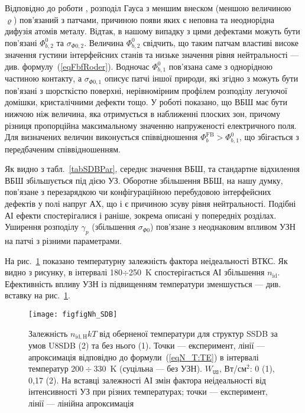 Відповідно до роботи \cite{Jiang:DGJap},
розподіл Гауса з меншим внеском (меншою величиною $\varrho$) пов'язаний з патчами, причиною появи яких є
неповна та неоднорідна дифузія атомів металу.
Відтак, в нашому випадку з цими дефектами можуть бути пов'язані $\Phi_{b,2}^0$ та $\sigma_{\Phi0,2}$.
Величина $\Phi_{b,2}^0$ свідчить, що таким патчам властиві високе значення густини інтерфейсних станів та низьке значення рівня нейтральності --- див. формулу~(\ref{eqFbfRoder}).
Водночас $\Phi_{b,1}^0$ пов'язана саме з однорідною частиною контакту,
а $\sigma_{\Phi0,1}$ описує патчі іншої природи, які згідно з \cite{Gammon2013} можуть бути пов'язані з шорсткістю поверхні,
нерівномірним профілем розподілу легуючої домішки, кристалічними дефекти тощо.
У роботі \cite{Rhoderick1988} показано, що ВБШ має бути нижчою ніж величина, яка отримується в наближенні плоских зон,
причому різниця пропорційна максимальному значенню напруженості електричного поля.
Для визначених величин виконується співвідношення $\Phi_{b}^\mathrm{FB}>\Phi_{b,1}^0$, що  збігається з передбаченим співвідношенням.

Як видно з табл.~\ref{tabSDBPar}, середнє значення ВБШ, та стандартне відхилення ВБШ збільшується під дією УЗ.
Оборотне збільшення ВБШ, на нашу думку, пов'язане з перезарядкою чи конфігураційною перебудовою інтерфейсних дефектів у полі напруг
АХ, що і є причиною зсуву рівня нейтральності.
Подібні АІ ефекти спостерігалися і раніше, зокрема описані у попередніх розділах.
Уширення розподілу $\gamma_p$ (збільшення $\sigma_{\Phi0}$) пов'язане з неоднаковим впливом УЗН на патчі з різними параметрами.

На рис.~\ref{figfigNh_SDB} показано температурну залежність фактора неідеальності ВТКС.
Як видно з рисунку, в інтервалі 180$\div$250~K спостерігається АІ збільшення $n_\mathrm{id}$.
Ефективність впливу УЗН із підвищенням температури зменшується --- див. вставку на рис.~\ref{figfigNh_SDB}.

\begin{figure}
\center
\texttt{[image: figfigNh\_SDB]}
\caption{\label{figfigNh_SDB}
Залежність $n_\mathrm{id,H}kT$ від оберненої температури для структур SSDB за умов U8SDB (2) та без нього (1).
Точки --- експеримент, лінії --- апроксимація відповідно до формули~(\ref{eqN_T:TE}) в інтервалі
температур $200\div330$~K (суцільна --- без УЗН).
$W_\mathtt{US}$,  Вт/см$^2$: 0 (1), 0,17 (2).
На вставці залежності АІ змін фактора неідеальності від інтенсивності УЗ при різних температурах;
точки --- експеримент, лінії --- лінійна апроксимація
}%
\end{figure}

